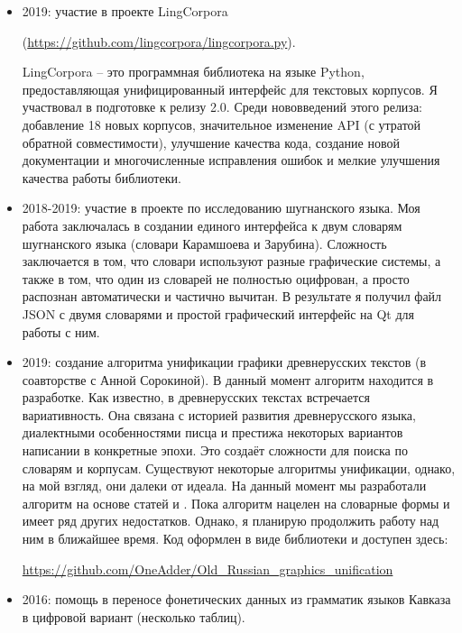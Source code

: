 \documentclass[a4paper,10pt]{article}
\begin{document}
\begin{itemize}
 \item 2019: участие в проекте LingCorpora 
 
 (\href{https://github.com/lingcorpora/lingcorpora.py}{https://github.com/lingcorpora/lingcorpora.py}).
 
 LingCorpora -- это программная библиотека на языке Python, предоставляющая унифицированный интерфейс для текстовых корпусов. Я участвовал в подготовке к релизу 2.0. Среди нововведений этого релиза: добавление 18 новых корпусов, значительное изменение API (с утратой обратной совместимости), улучшение качества кода, создание новой документации и многочисленные исправления ошибок и мелкие улучшения качества работы библиотеки.
 \item 2018-2019: участие в проекте по исследованию шугнанского языка. Моя работа заключалась в создании единого интерфейса к двум словарям шугнанского языка (словари Карамшоева и Зарубина). Сложность заключается в том, что словари используют разные графические системы, а также в том, что один из словарей не полностью оцифрован, а просто распознан автоматически и частично вычитан. В результате я получил файл JSON с двумя словарями и простой графический интерфейс на Qt для работы с ним.
 \item 2019: создание алгоритма унификации графики древнерусских текстов (в соавторстве с Анной Сорокиной). В данный момент алгоритм находится в разработке. Как известно, в древнерусских текстах встречается вариативность. Она связана с историей развития древнерусского языка, диалектными особенностями писца и престижа некоторых вариантов написании в конкретные эпохи. Это создаёт сложности для поиска по словарям и корпусам. Существуют некоторые алгоритмы унификации, однако, на мой взгляд, они далеки от идеала. На данный момент мы разработали алгоритм на основе статей \parencite{OldRussian1} и \parencite{OldRussian2}. Пока алгоритм нацелен на словарные формы и имеет ряд других недостатков. Однако, я планирую продолжить работу над ним в ближайшее время.
 Код оформлен в виде библиотеки и доступен здесь:
 
 \href{https://github.com/OneAdder/Old\_Russian\_graphics\_unification}{https://github.com/OneAdder/Old\_Russian\_graphics\_unification}
 
 \item 2016: помощь в переносе фонетических данных из грамматик языков Кавказа в цифровой вариант (несколько таблиц).
\end{itemize}
 
\end{document}
